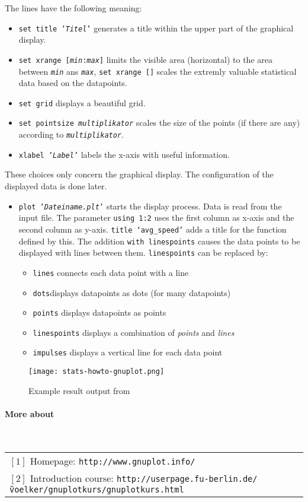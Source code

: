 The lines have the following meaning:
\begin{itemize}
\item \texttt{set title '\textit{Titel}'} generates a title within the upper part of the graphical display.
\item \texttt{set xrange [\textit{min}:\textit{max}]} limits the visible area (horizontal) to the area between \texttt{\textit{min}} ans \texttt{\textit{max}}, \texttt{set xrange []} scales the extremly valuable statistical data based on the datapoints.
\item \texttt{set grid} displays a beautiful grid.
\item \texttt{set pointsize \textit{multiplikator}} scales the size of the points (if there are any) according to \texttt{\textit{multiplikator}}.
\item \texttt{xlabel '\textit{Label}'} labels the x-axis with useful information.
\end{itemize}
These choices only concern the graphical display. The configuration of the displayed data is done later.

\begin{itemize}
 \item \texttt{plot '\textit{Dateiname.plt}'} starts the display process. Data is read from the input file. The parameter \texttt{using 1:2} uses the first column as x-axis and the second column as y-axis. \texttt{title `avg\_speed'} adds a title for the function defined by this. The addition \texttt{with linespoints} causes the data points to be displayed with lines between them. \texttt{linespoints} can be replaced by:
\begin{itemize}
\item \texttt{lines} connects each data point with a line
\item \texttt{dots}displays datapoints as dots (for many datapoints)
\item \texttt{points} displays datapoints as points
\item \texttt{linespoints} displays a combination of \textit{points} and \textit{lines}
\item \texttt{impulses} displays a vertical line for each data point
\end{itemize}

\end{itemize}

\begin{figure}
	\texttt{[image: stats-howto-gnuplot.png]}
	\caption{Example result output from \gnuplot}
\end{figure}


\paragraph{More about \gnuplot}~\\

\begin{tabular}{l}
 $[1]$ Homepage: \texttt{\scriptsize http://www.gnuplot.info/} \\
 $[2]$ Introduction course: \texttt{\scriptsize http://userpage.fu-berlin.de/\~voelker/gnuplotkurs/gnuplotkurs.html}
\end{tabular}